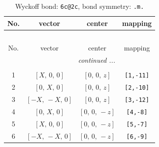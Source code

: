 \documentclass[fleqn,8pt]{jsarticle}
\begin{document}
\renewcommand{\arraystretch}{1.2}
\begin{longtable}{cccc}
\caption{Wyckoff bond: {\tt 6c@2c}, bond symmetry: {\tt .m.}}
 \\
 \hline \hline
No. & vector & center & mapping \\ \hline \endfirsthead

\multicolumn{3}{l}{\tablename\ \thetable{}} \\
 \hline \hline
No. & vector & center & mapping \\ \hline \endhead

 \hline \hline
\multicolumn{3}{r}{\footnotesize\it continued ...} \\ \endfoot

 \hline \hline
\multicolumn{3}{r}{} \\ \endlastfoot

1 & $\left[ X,\, 0,\, 0 \right]$ & $\left[ 0,\, 0,\, z \right]$ & {\tt [1,-11]} \\ \hline
2 & $\left[ 0,\, X,\, 0 \right]$ & $\left[ 0,\, 0,\, z \right]$ & {\tt [2,-10]} \\ \hline
3 & $\left[ - X,\, - X,\, 0 \right]$ & $\left[ 0,\, 0,\, z \right]$ & {\tt [3,-12]} \\ \hline
4 & $\left[ 0,\, X,\, 0 \right]$ & $\left[ 0,\, 0,\, - z \right]$ & {\tt [4,-8]} \\ \hline
5 & $\left[ X,\, 0,\, 0 \right]$ & $\left[ 0,\, 0,\, - z \right]$ & {\tt [5,-7]} \\ \hline
6 & $\left[ - X,\, - X,\, 0 \right]$ & $\left[ 0,\, 0,\, - z \right]$ & {\tt [6,-9]} \\
\end{longtable}
\renewcommand{\arraystretch}{1.2}
\end{document}
